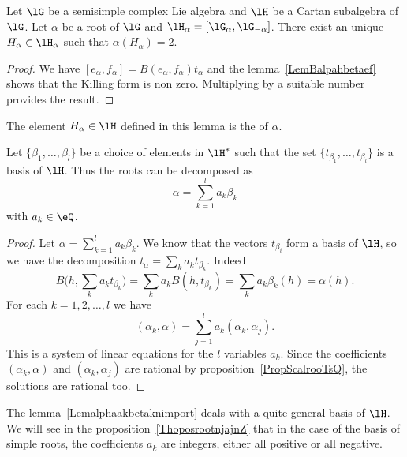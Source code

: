 \begin{corollary}       \label{CorrExistInverseRoot}
    Let \( \lG\) be a semisimple complex Lie algebra and \( \lH\) be a Cartan subalgebra of \( \lG\). Let \( \alpha\) be a root of \( \lG\) and \( \lH_{\alpha}=[\lG_{\alpha},\lG_{-\alpha}]\). There exist an unique \( H_{\alpha}\in\lH_{\alpha}\) such that \( \alpha(H_{\alpha})=2\).
\end{corollary}

\begin{proof}
    We have \( [e_{\alpha},f_{\alpha}]=B(e_{\alpha},f_{\alpha})t_{\alpha}\) and the lemma~\ref{LemBalpahbetaef} shows that the Killing form is non zero. Multiplying by a suitable number provides the result.
\end{proof}
The element \( H_{\alpha}\in\lH\) defined in this lemma is the  of \( \alpha\).

\begin{lemma}       \label{Lemalphaakbetaknimport}
    Let \( \{ \beta_1,\ldots,\beta_l \}\) be a choice of elements in \( \lH^*\) such that the set \( \{ t_{\beta_1},\ldots,t_{\beta_l} \}\) is a basis of \( \lH\). Thus the roots can be decomposed as
    \begin{equation}
        \alpha=\sum_{k=1}^la_k\beta_k
    \end{equation}
    with \( a_k\in\eQ\).
\end{lemma}

\begin{proof}

    Let \( \alpha=\sum_{k=1}^la_k\beta_k\). We know that the vectors \( t_{\beta_i}\) form a basis of \( \lH\), so we have the decomposition \( t_{\alpha}=\sum_ka_kt_{\beta_k}\). Indeed
    \begin{equation}
        B\big( h,\sum_k a_kt_{\beta_k} \big)=\sum_ka_k B(h,t_{\beta_k})=\sum_ka_k\beta_k(h)=\alpha(h).
    \end{equation}
    For each \( k=1,2,\ldots,l\) we have
    \begin{equation}
        (\alpha_k, \alpha) =\sum_{j=1}^la_k(\alpha_k, \alpha_j).
    \end{equation}
    This is a system of linear equations for the \( l\) variables \( a_k\). Since the coefficients \( (\alpha_k,\alpha)\) and \( (\alpha_k,\alpha_j)\) are rational by proposition~\ref{PropScalrooTsQ}, the solutions are rational too.
\end{proof}

\begin{remark}
    The lemma~\ref{Lemalphaakbetaknimport} deals with a quite general basis of \( \lH\). We will see in the proposition~\ref{ThoposrootnjajnZ} that in the case of the basis of simple roots, the coefficients \( a_k\) are integers, either all positive or all negative.
\end{remark}

